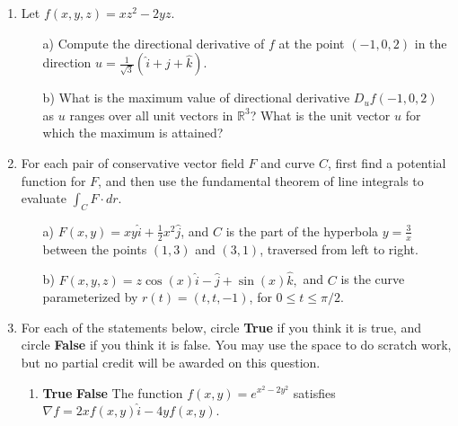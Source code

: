 \documentclass[12 pt]{report}
\begin{document}
\newpage
\begin{enumerate}

\item Let $f(x,y,z) = xz^2 - 2yz$. 

\begin{enumerate} \item[a)] Compute the directional derivative of $f$ at the point $(-1,0,2)$ in the direction $u = \frac{1}{\sqrt{3}} (\hat{i} + \hat{j} + \hat{k})$. 

\vfill 

\item[b)] What is the maximum value of directional derivative $D_u f(-1,0,2)$ as $u$ ranges over all unit vectors in $\mathbb{R}^3$? What is the unit vector $u$ for which the maximum is attained?

\vfill

\end{enumerate}

\newpage

\item For each pair of conservative vector field $F$ and curve $C$, first find a potential function for $F$, and then use the fundamental theorem of line integrals to evaluate $\int_C F \cdot dr$. 

\begin{enumerate} \item[a)] $F(x,y) = xy \hat{i} + \frac{1}{2}x^2 \hat{j}$, and $C$ is the part of the hyperbola $y = \frac{3}{x}$ between the points $(1,3)$ and $(3,1)$, traversed from left to right. 

\vfill

\item[b)] $F(x,y,z) = z\cos(x) \hat{i} - \hat{j} + \sin(x) \hat{k},$ and $C$ is the curve parameterized by $r(t) = (t, t, -1)$, for $0 \leq t \leq \pi/2$. 

\vfill

\end{enumerate}

\newpage


\item For each of the statements below, circle \textbf{True} if you think it is true, and circle \textbf{False} if you think it is false. You may use the space to do scratch work, but no partial credit will be awarded on this question. 

\begin{enumerate} 
\item \textbf{True} \hspace{5pt} \textbf{False} \hspace{10pt} The function $f(x,y) = e^{x^2-2y^2}$ satisfies $\nabla f = 2x f(x,y) \hat{i} - 4y f(x,y)$.


\end{enumerate}
\end{enumerate}
\end{document}
